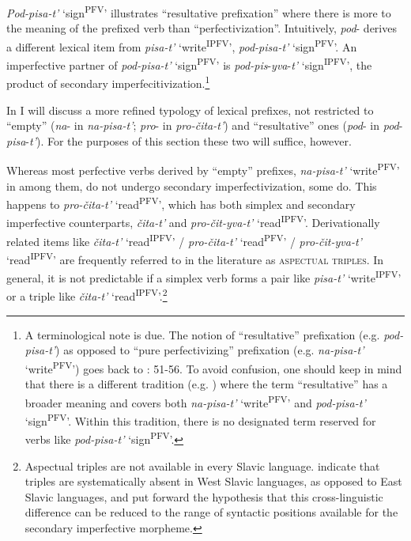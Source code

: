 \documentclass[output=paper,colorlinks,citecolor=brown]{langscibook}
\begin{document}
\textit{Pod-pisa-t’} ‘sign\textsuperscript{PFV}’ illustrates “resultative prefixation” where there is more to the meaning of the prefixed verb than “perfectivization”. Intuitively, \textit{pod}- derives a different lexical item from \textit{pisa-t’} ‘write\textsuperscript{IPFV}’, \textit{pod-pisa-t’} ‘sign\textsuperscript{PFV}’. An imperfective partner of \textit{pod-pisa-t’} ‘sign\textsuperscript{PFV}’ is \textit{pod-pis}\textsc{-}\textit{yva}\textsc{-}\textit{t’} ‘sign\textsuperscript{IPFV}’, the product of secondary imperfecitivization.\footnote{A terminological note is due. The notion of “resultative” prefixation (e.g. \textit{pod-pisa-t’}) as opposed to “pure perfectivizing” prefixation (e.g. \textit{na-pisa-t’} ‘write\textsuperscript{PFV}’) goes back to \citet{BabkoMalaya1999}: 51-56. To avoid confusion, one should keep in mind that there is a different tradition (e.g. \citealt{Isacenko1960}) where the term “resultative” has a broader meaning and covers both \textit{na-pisa-t’} ‘write\textsuperscript{PFV}’ and \textit{pod-pisa-t’} ‘sign\textsuperscript{PFV}’. Within this tradition, there is no designated term reserved for verbs like \textit{pod-pisa-t’} ‘sign\textsuperscript{PFV}’.}  

In  I will discuss a more refined typology of lexical prefixes, not restricted to “empty” (\textit{na}- in \textit{na-pisa-t’}; \textit{pro}- in \textit{pro-čita-t’}) and “resultative” ones (\textit{pod}- in \textit{pod}-\textit{pisa}-\textit{t’}). For the purposes of this section these two will suffice, however. 

Whereas most perfective verbs derived by “empty” prefixes, \textit{na-pisa-t’} ‘write\textsuperscript{PFV}’ in  among them, do not undergo secondary imperfectivization, some do. This happens to \textit{pro-čita-t’} ‘read\textsuperscript{PFV}’, which has both simplex and secondary imperfective counterparts, \textit{čita-t’} and \textit{pro-čit-yva-t’} ‘read\textsuperscript{IPFV}’. Derivationally related items like \textit{čita-t’} ‘read\textsuperscript{IPFV}’ /  \textit{pro-čita-t’} ‘read\textsuperscript{PFV}’ / \textit{pro-čit-yva-t’} ‘read\textsuperscript{IPFV}’   are frequently referred to in the literature as \textsc{aspectual triples}. In general, it is not predictable if a simplex verb forms a pair like \textit{pisa-t’} ‘write\textsuperscript{IPFV}’ or a triple like \textit{čita-t’} ‘read\textsuperscript{IPFV}’.\footnote{Aspectual triples are not available in every Slavic language. \citet{Klimek-Jankowska.etal2025} indicate that triples are systematically absent in West Slavic languages, as opposed to East Slavic languages, and put forward the hypothesis that this cross-linguistic difference can be reduced to the range of syntactic positions available for the secondary imperfective morpheme.}  
\end{document}
